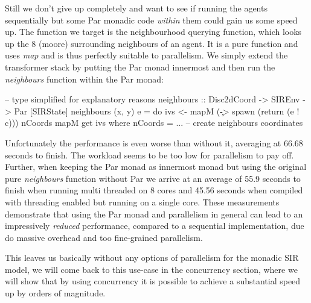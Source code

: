 Still we don't give up completely and want to see if running the agents sequentially but some Par monadic code \textit{within} them could gain us some speed up. The function we target is the neighbourhood querying function, which looks up the 8 (moore) surrounding neighbours of an agent. It is a pure function and uses \textit{map} and is thus perfectly suitable to parallelism. We simply extend the transformer stack by putting the Par monad innermost and then run the \textit{neighbours} function within the Par monad:

\begin{HaskellCode}
-- type simplified for explanatory reasons
neighbours :: Disc2dCoord -> SIREnv -> Par [SIRState]
neighbours (x, y) e = do
    ivs <- mapM (\c -> spawn (return (e ! c))) nCoords
    mapM get ivs
  where
    nCoords = ... -- create neighbours coordinates
\end{HaskellCode}

Unfortunately the performance is even worse than without it, averaging at 66.68 seconds to finish. The workload seems to be too low for parallelism to pay off. Further, when keeping the Par monad as innermost monad but using the original pure \textit{neighbours} function without Par we arrive at an average of 55.9 seconds to finish when running multi threaded on 8 cores and 45.56 seconds when compiled with threading enabled but running on a single core. These measurements demonstrate that using the Par monad and parallelism in general can lead to an impressively \textit{reduced} performance, compared to a sequential implementation, due do massive overhead and too fine-grained parallelism.

This leaves us basically without any options of parallelism for the monadic SIR model, we will come back to this use-case in the concurrency section, where we will show that by using concurrency it is possible to achieve a substantial speed up by orders of magnitude.